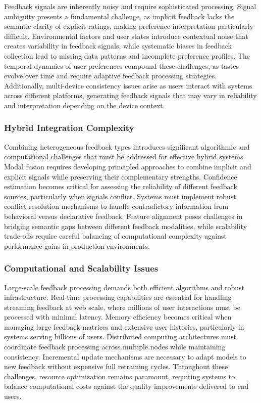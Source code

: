 Feedback signals are inherently noisy and require sophisticated processing. Signal ambiguity presents a fundamental challenge, as implicit feedback lacks the semantic clarity of explicit ratings, making preference interpretation particularly difficult. Environmental factors and user states introduce contextual noise that creates variability in feedback signals, while systematic biases in feedback collection lead to missing data patterns and incomplete preference profiles. The temporal dynamics of user preferences compound these challenges, as tastes evolve over time and require adaptive feedback processing strategies. Additionally, multi-device consistency issues arise as users interact with systems across different platforms, generating feedback signals that may vary in reliability and interpretation depending on the device context.

\subsubsection{Hybrid Integration Complexity}

Combining heterogeneous feedback types introduces significant algorithmic and computational challenges that must be addressed for effective hybrid systems. Modal fusion requires developing principled approaches to combine implicit and explicit signals while preserving their complementary strengths. Confidence estimation becomes critical for assessing the reliability of different feedback sources, particularly when signals conflict. Systems must implement robust conflict resolution mechanisms to handle contradictory information from behavioral versus declarative feedback. Feature alignment poses challenges in bridging semantic gaps between different feedback modalities, while scalability trade-offs require careful balancing of computational complexity against performance gains in production environments.

\subsubsection{Computational and Scalability Issues}

Large-scale feedback processing demands both efficient algorithms and robust infrastructure. Real-time processing capabilities are essential for handling streaming feedback at web scale, where millions of user interactions must be processed with minimal latency. Memory efficiency becomes critical when managing large feedback matrices and extensive user histories, particularly in systems serving billions of users. Distributed computing architectures must coordinate feedback processing across multiple nodes while maintaining consistency. Incremental update mechanisms are necessary to adapt models to new feedback without expensive full retraining cycles. Throughout these challenges, resource optimization remains paramount, requiring systems to balance computational costs against the quality improvements delivered to end users.

